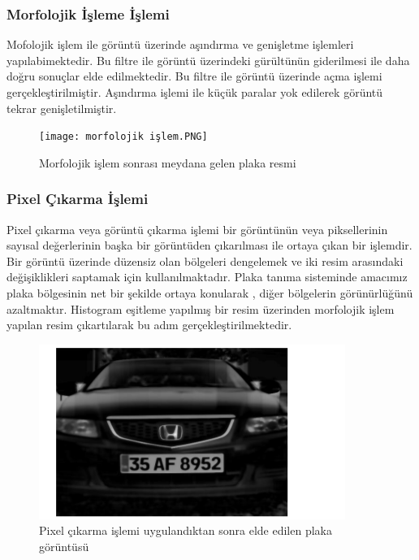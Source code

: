 \subsubsection{Morfolojik İşleme İşlemi}
\cite{detection}
Mofolojik işlem ile görüntü üzerinde aşındırma ve genişletme işlemleri yapılabimektedir. Bu filtre ile görüntü üzerindeki gürültünün giderilmesi ile daha doğru sonuçlar elde edilmektedir. Bu filtre ile görüntü üzerinde açma işlemi gerçekleştirilmiştir. Aşındırma işlemi ile küçük paralar yok edilerek görüntü tekrar genişletilmiştir.
\begin{figure}
    \centering
    \texttt{[image: morfolojik işlem.PNG]}
    \caption{Morfolojik işlem sonrası meydana gelen plaka resmi}
    \label{fig:my_label}
\end{figure}
\subsubsection{Pixel Çıkarma İşlemi}
\cite{vision} Pixel çıkarma veya görüntü çıkarma işlemi bir görüntünün veya piksellerinin sayısal değerlerinin başka bir görüntüden çıkarılması ile ortaya çıkan bir işlemdir. Bir görüntü üzerinde düzensiz olan bölgeleri dengelemek ve iki resim arasındaki değişiklikleri saptamak için kullanılmaktadır. Plaka tanıma sisteminde amacımız plaka bölgesinin net bir şekilde ortaya konularak , diğer bölgelerin görünürlüğünü azaltmaktır. Histogram eşitleme yapılmış bir resim üzerinden morfolojik işlem yapılan resim çıkartılarak bu adım gerçekleştirilmektedir.
\begin{figure}
    \centering
    \includegraphics{pixel çıkarma işlemi.PNG}
    \caption{Pixel çıkarma işlemi uygulandıktan sonra elde edilen plaka görüntüsü}
    \label{fig:my_label}
\end{figure}
